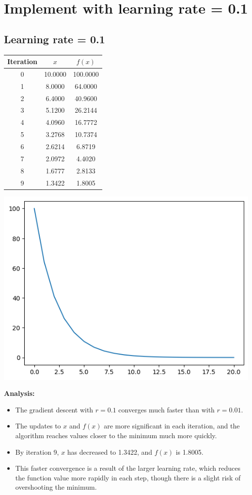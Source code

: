 \documentclass[12pt]{article}
\begin{document}
\section{{Implement with learning rate = 0.1}}
\subsection{Learning rate = 0.1}
\begin{center}
\begin{tabular}{|c|c|c|}
\hline
Iteration & $x$ & $f(x)$ \\
\hline
0 & 10.0000 & 100.0000 \\
1 & 8.0000 & 64.0000 \\
2 & 6.4000 & 40.9600 \\
3 & 5.1200 & 26.2144 \\
4 & 4.0960 & 16.7772 \\
5 & 3.2768 & 10.7374 \\
6 & 2.6214 & 6.8719 \\
7 & 2.0972 & 4.4020 \\
8 & 1.6777 & 2.8133 \\
9 & 1.3422 & 1.8005 \\
\hline
\end{tabular}
\end{center}

\begin{center}
    \includegraphics[scale=0.7]{output_0.1.png}
\end{center}

\textbf{Analysis:}
\begin{itemize}
    \item The gradient descent with \( r = 0.1 \) converges much faster than with \( r = 0.01 \).
    \item The updates to \( x \) and \( f(x) \) are more significant in each iteration, and the algorithm reaches values closer to the minimum much more quickly.
    \item By iteration 9, \( x \) has decreased to 1.3422, and \( f(x) \) is 1.8005.
    \item This faster convergence is a result of the larger learning rate, which reduces the function value more rapidly in each step, though there is a slight risk of overshooting the minimum.
\end{itemize}
\end{document}
